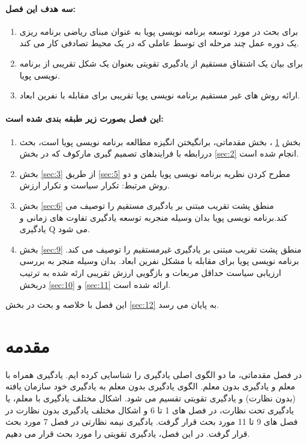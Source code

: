 \documentclass[oneside, 11pt, a4paper]{book}
\begin{document}
\paragraph{سه هدف این فصل: \\}

\begin{enumerate}
    \item برای بحث در مورد توسعه برنامه نویسی پویا به عنوان مبنای ریاضی برنامه ریزی یک دوره عمل چند مرحله ای توسط عاملی که در یک محیط تصادفی کار می کند.
    \item برای بیان یک اشتقاق مستقیم از یادگیری تقویتی بعنوان یک شکل تقریبی از برنامه نویسی پویا.
    \item ارائه روش های غیر مستقیم برنامه نویسی پویا تقریبی برای مقابله با نفرین ابعاد.
\end{enumerate}

\paragraph{این فصل بصورت زیر طبقه بندی شده است:}

\begin{enumerate}
    \item بخش \ref{sec:1} ، بخش مقدماتی، برانگیختن انگیزه مطالعه برنامه نویسی پویا است، بحث دررابطه با فرایندهای تصمیم گیری مارکوف که در بخش \ref{sec:2} انجام شده است.
    \item بخش \ref{sec:3} از طریق \ref{sec:5} مطرح کردن نظریه برنامه نویسی پویا بلمن و دو روش مرتبط: تکرار سیاست و تکرار ارزش.
    \item بخش \ref{sec:6} منطق پشت تقریب مبتنی بر یادگیری مستقیم را توصیف می کند.برنامه نویسی پویا بدان وسیله منجربه توسعه یادگیری تفاوت های زمانی و یادگیری Q می شود.
    \item بخش \ref{sec:9} منطق پشت تقریب مبتنی بر یادگیری غیرمستقیم را توصیف می کند. برنامه نویسی پویا برای مقابله با مشکل نفرین ابعاد. بدان وسیله منجر به بررسی ارزیابی سیاست حداقل مربعات و بازگویی ارزش تقریبی ارئه شده به ترتیب دربخش \ref{sec:10} و \ref{sec:11} ارائه شده است.
\end{enumerate}
این فصل با خلاصه و بحث در بخش \ref{sec:12} به پایان می رسد.

\section{مقدمه}\label{sec:1}

در فصل مقدماتی، ما دو الگوی اصلی یادگیری را شناسایی کرده ایم. یادگیری همراه با معلم و یادگیری بدون معلم. الگوی یادگیری بدون معلم به یادگیری خود سازمان یافته (بدون نظارت) و یادگیری تقویتی تقسیم می شود.
اشکال مختلف یادگیری با معلم، یا یادگیری تحت نظارت، در فصل های 1 تا 6 و اشکال مختلف یادگیری بدون نظارت در فصل های 9 تا 11 مورد بحث قرار گرفت. یادگیری نیمه نظارتی در فصل 7 مورد بحث قرار گرفت.
در این فصل، یادگیری تقویتی را مورد بحث قرار می دهیم.
\end{document}
